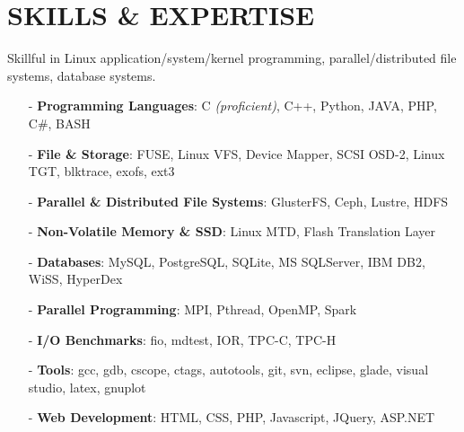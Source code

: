 \section{SKILLS \& EXPERTISE}
Skillful in Linux application/system/kernel programming, parallel/distributed file systems, database systems.
\begin{itemize}[leftmargin=*]
\setlength\itemsep{-0.02in}
\item[-] {\bf Programming Languages}: C {\footnotesize \it (proficient)}, C++,
         Python, JAVA, PHP, C\#, BASH
\item[-] {\bf File \& Storage}: FUSE, Linux VFS, Device Mapper, SCSI OSD-2, Linux TGT, blktrace, exofs, ext3
\item[-] {\bf Parallel \& Distributed File Systems}: GlusterFS, Ceph, Lustre, HDFS
\item[-] {\bf Non-Volatile Memory \& SSD}: Linux MTD, Flash Translation Layer
\item[-] {\bf Databases}: MySQL, PostgreSQL, SQLite, MS SQLServer, IBM DB2, WiSS, HyperDex
\item[-] {\bf Parallel Programming}: MPI, Pthread, OpenMP, Spark
\item[-] {\bf I/O Benchmarks}: fio, mdtest, IOR, TPC-C, TPC-H
\item[-] {\bf Tools}: gcc, gdb, cscope, ctags, autotools, git, svn, eclipse, glade, visual studio, latex, gnuplot
\item[-] {\bf Web Development}: HTML, CSS, PHP, Javascript, JQuery, ASP.NET
\end{itemize}

